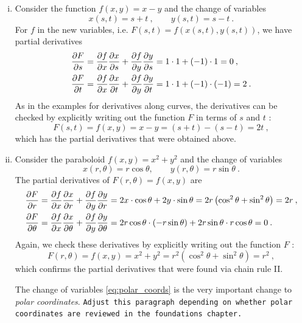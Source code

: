 \begin{example}
\label{expl:chain_rule_ii}
\begin{enumerate}[(i)]
	\item Consider the function $f(x,y)=x-y$ and the change of variables 
	\[x(s,t)=s+t \:, \qquad y(s,t)=s-t \:. \]
	For $f$ in the new variables, i.e. $F(s,t)=f(x(s,t),y(s,t))$, we have partial derivatives 
	\begin{equation*}
	\begin{split}
	\displaystyle{\frac{\partial F}{\partial s}} & = \displaystyle{\frac{\partial f}{\partial x}}\displaystyle{\frac{\partial x}{\partial s}} + \displaystyle{\frac{\partial f}{\partial y}}\displaystyle{\frac{\partial y}{\partial s}} = 1 \cdot 1 + (-1) \cdot 1 = 0 \:, \\
	\displaystyle{\frac{\partial F}{\partial t}} & = \displaystyle{\frac{\partial f}{\partial x}}\displaystyle{\frac{\partial x}{\partial t}} + \displaystyle{\frac{\partial f}{\partial y}}\displaystyle{\frac{\partial y}{\partial t}} = 1 \cdot 1 + (-1) \cdot (-1) = 2 \:.
	\end{split}
	\end{equation*}
	As in the examples for derivatives along curves, the derivatives can be checked by explicitly writing out the function $F$ in terms of $s$ and $t$ :
	\[ F(s,t) = f(x,y) = x-y = (s+t)-(s-t) = 2t \:, \]
	which has the partial derivatives that were obtained above.
	\item Consider the paraboloid $f(x,y)=x^2+y^2$ and the change of variables
	\begin{equation}
	\label{eq:polar_coords}
	x(r,\theta)=r\cos\theta, \qquad y(r,\theta)=r\sin\theta \:.
	\end{equation}
	The partial derivatives of $F(r,\theta)=f(x,y)$ are
	\begin{equation*}
	\begin{split}
	\displaystyle{\frac{\partial F}{\partial r}} & = \displaystyle{\frac{\partial f}{\partial x}}\displaystyle{\frac{\partial x}{\partial r}} + \displaystyle{\frac{\partial f}{\partial y}}\displaystyle{\frac{\partial y}{\partial r}} 
	= 2x \cdot \cos\theta + 2y \cdot \sin\theta 
	= 2r \left( \cos^2\theta + \sin^2\theta \right) = 2r \:, \\
	\displaystyle{\frac{\partial F}{\partial \theta}} & = \displaystyle{\frac{\partial f}{\partial x}}\displaystyle{\frac{\partial x}{\partial \theta}} + \displaystyle{\frac{\partial f}{\partial y}}\displaystyle{\frac{\partial y}{\partial \theta}} 
	= 2r\cos\theta \cdot (-r\sin\theta) + 2r\sin\theta \cdot r\cos\theta = 0 \:.
	\end{split}
	\end{equation*}
	Again, we check these derivatives by explicitly writing out the function $F$ :
	\[ F(r,\theta) = f(x,y) = x^2+y^2 = r^2 \left( \cos^2\theta + \sin^2\theta \right) = r^2 \:, \]
	which confirms the partial derivatives that were found via chain rule II.
	
	The change of variables \eqref{eq:polar_coords} is the very important change to \emph{polar coordinates}. \texttt{Adjust this paragraph depending on whether polar coordinates are reviewed in the foundations chapter.}
	

\end{enumerate}
\end{example}

